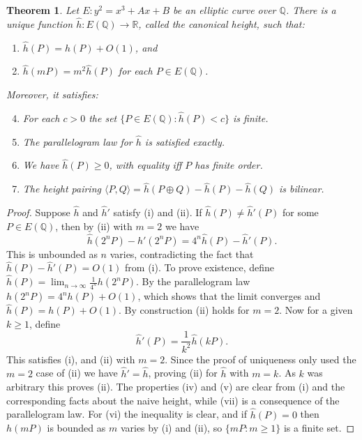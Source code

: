\documentclass[a4paper]{article}
\theoremstyle{plain}
\newtheorem{theorem}{Theorem}
\theoremstyle{remark}
\theoremstyle{definition}
\newcommand{\Q}{\mathbb{Q}}
\newcommand{\R}{\mathbb{R}}
\begin{document}
\begin{theorem}
    Let $E:y^2=x^3+Ax+B$ be an elliptic curve over $\Q$. There is a unique
    function $\hat h:E(\Q)\to\R$, called the canonical height, such that:
    \begin{enumerate}[label=(\roman*)]
        \item $\hat h(P)=h(P)+O(1)$, and
        \item $\hat h(mP)=m^2\hat h(P)$ for each $P\in E(\Q)$.
    \end{enumerate}
    Moreover, it satisfies:
    \begin{enumerate}[label=(\roman*)]
        \setcounter{enumi}{3}
        \item For each $c>0$ the set $\{P\in E(\Q):\hat h(P)<c\}$ is
            finite.

        \item The parallelogram law for $\hat h$ is satisfied exactly.

        \item We have $\hat h(P)\ge0$, with equality iff $P$ has finite
            order.

        \item The height pairing
            $\langle P,Q\rangle=\hat h(P\oplus Q)-\hat h(P)-\hat h(Q)$ is
            bilinear.
    \end{enumerate}
\end{theorem}

\begin{proof}
    Suppose $\hat h$ and $\hat h'$ satisfy (i) and (ii). If
    $\hat h(P)\ne\hat h'(P)$ for some $P\in E(\Q)$, then by (ii) with $m=2$ we
    have
    \begin{equation*}
        \hat h(2^nP)-\hat h'(2^nP) = 4^n\hat h(P)-\hat h'(P).
    \end{equation*}
    This is unbounded as $n$ varies, contradicting the fact that
    $\hat h(P)-\hat h'(P)=O(1)$ from (i). To prove existence, define
    $\hat h(P)=\lim_{n\to\infty}\frac{1}{4^n}h(2^nP)$. By the parallelogram
    law $h(2^nP)=4^nh(P)+O(1)$, which shows that the limit converges and
    $\hat h(P)=h(P)+O(1)$. By construction (ii) holds for $m=2$. Now for a
    given $k\ge1$, define
    \begin{equation*}
        \hat h'(P) = \frac{1}{k^2}\hat h(kP).
    \end{equation*}
    This satisfies (i), and (ii) with $m=2$. Since the proof of uniqueness only
    used the $m=2$ case of (ii) we have $\hat h'=\hat h$, proving (ii) for
    $\hat h$ with $m=k$. As $k$ was arbitrary this proves (ii). The properties
    (iv) and (v) are clear from (i) and the corresponding facts about the naive
    height, while (vii) is a consequence of the parallelogram law. For (vi) the
    inequality is clear, and if $\hat h(P)=0$ then $h(mP)$ is bounded as $m$
    varies by (i) and (ii), so $\{mP:m\ge1\}$ is a finite set.
\end{proof}
\end{document}
